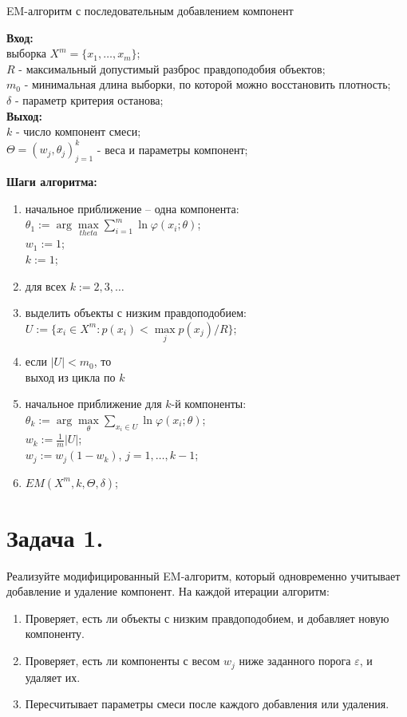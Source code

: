 \begin{algorithm}[H]
\caption{EM-алгоритм с последовательным добавлением компонент}
\textbf{Вход:} \\
выборка $X^m = \{x_1, \ldots, x_m\}$;\\
$R$ - максимальный допустимый разброс правдоподобия объектов;\\
$m_0$ - минимальная длина выборки, по которой можно восстановить плотность;\\
$\delta$ - параметр критерия останова; \\
\textbf{Выход:} \\
$k$ - число компонент смеси;\\
$\Theta = (w_j, \theta_j)_{j = 1}^k$ - веса и параметры компонент;

\textbf{Шаги алгоритма:}
\begin{enumerate}
    \item начальное приближение -- одна компонента:\\
        $\theta_1 := \arg\max\limits_{theta}\sum\limits_{i=1}^m \ln{\varphi(x_i; \theta)}$; \\
        $w_1 := 1$;\\
        $k := 1$;
    \item для всех $k := 2, 3, \ldots$
    \item выделить объекты с низким правдоподобием: \\
        $U := \{x_i \in X^m : p(x_i) < \max\limits_{j} p(x_j) / R\}$;
    \item если $|U| < m_0$, то \\
          выход из цикла по $k$
    \item начальное приближение для $k$-й компоненты:\\
        $\theta_k := \arg\max\limits_{\theta}\sum\limits_{x_i \in U} \ln{\varphi(x_i; \theta)}$;\\
        $w_k := \frac{1}{m}|U|$; \\
        $w_j := w_j(1 - w_k)$, $j = 1, \ldots, k - 1$;
    \item $EM(X^m, k, \Theta, \delta)$;
\end{enumerate}
\end{algorithm}

\section*{\textbf{Задача 1.}} Реализуйте модифицированный EM-алгоритм, который одновременно учитывает добавление и удаление компонент. На каждой итерации алгоритм:
\begin{enumerate}
\item Проверяет, есть ли объекты с низким правдоподобием, и добавляет новую компоненту.
\item Проверяет, есть ли компоненты с весом $w_j$ ниже заданного порога $\varepsilon$, и удаляет их.
\item Пересчитывает параметры смеси после каждого добавления или удаления.
\end{enumerate}

